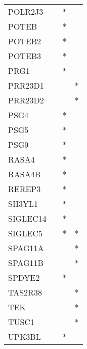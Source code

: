 \begin{longtable}{lccc}
POLR2J3      &       &  * &         \\
POTEB        &       &  * &         \\
POTEB2       &       &  * &         \\
POTEB3       &       &  * &         \\
PRG1         &       &  * &         \\
PRR23D1      &       &    &       * \\
PRR23D2      &       &    &       * \\
PSG4         &       &  * &         \\
PSG5         &       &  * &         \\
PSG9         &       &  * &         \\
RASA4        &       &  * &         \\
RASA4B       &       &  * &         \\
REREP3       &       &  * &         \\
SH3YL1       &       &  * &         \\
SIGLEC14     &       &  * &         \\
SIGLEC5      &       &  * &       * \\
SPAG11A      &       &    &       * \\
SPAG11B      &       &    &       * \\
SPDYE2       &       &  * &         \\
TAS2R38      &       &    &       * \\
TEK          &       &    &       * \\
TUSC1        &       &    &       * \\
UPK3BL       &       &  * &         \\
\end{longtable}
